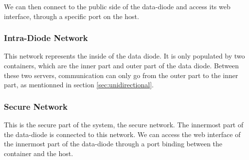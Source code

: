 \documentclass[a4paper,11pt]{article}
\begin{document}
We can then connect to the public side of the data-diode and access its web interface, through a specific port on the host.

\subsubsection{Intra-Diode Network}
This network represents the inside of the data diode. It is only populated by two containers, which are the inner part and outer part of the data diode. Between these two servers, communication can only go from the outer part to the inner part, as mentionned in section \ref{sec:unidirectional}.\\

\subsubsection{Secure Network}
This is the secure part of the system, the secure network. The innermost part of the data-diode is connected to this network. We can access the web interface of the innermost part of the data-diode through a port binding between the container and the host.
\end{document}
